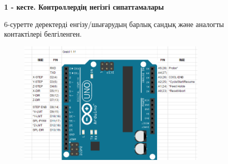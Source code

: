{\bfseries 1 - кесте. Контроллердің негізгі сипаттамалары}


6-суретте деректерді енгізу/шығарудың барлық сандық және аналогты
контактілері белгіленген.


\begin{figure}[H]
	\centering
	\includegraphics[width=0.8\textwidth]{media/ict2/image174}
	\caption*{}
\end{figure}


